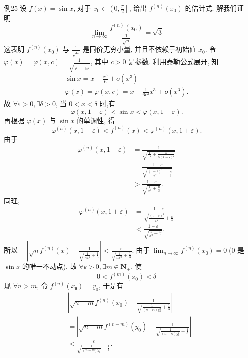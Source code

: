 例25 设 $f(x)=\sin x$, 对于 $x_0 \in\left(0, \frac{\pi}{2}\right]$, 给出 $f^{(n)}\left(x_0\right)$ 的估计式.
解我们证明
$$
\lim _{n \rightarrow \infty} \frac{f^{(n)}\left(x_0\right)}{\frac{1}{\sqrt{n}}}=\sqrt{3}
$$
这表明 $f^{(n)}\left(x_0\right)$ 与 $\frac{1}{\sqrt{n}}$ 是同价无穷小量, 并且不依赖于初始值 $x_0$.
令 $\varphi(x)=\varphi(x, c)=\frac{1}{\sqrt{\frac{1}{x^2}+\frac{1}{3 c^2}}}$, 其中 $c>0$ 是参数.
利用泰勒公式展开, 知
$$
\begin{gathered}
\sin x=x-\frac{x^3}{6}+o\left(x^3\right) \\
\varphi(x)=\varphi(x, c)=x-\frac{1}{6 c^2} x^3+o\left(x^3\right) .
\end{gathered}
$$
故 $\forall \varepsilon>0, \exists \delta>0$, 当 $0<x<\delta$ 时,有
$$
\varphi(x, 1-\varepsilon)<\sin x<\varphi(x, 1+\varepsilon) .
$$
再根据 $\varphi(x)$ 与 $\sin x$ 的单调性, 得
$$
\varphi^{(n)}(x, 1-\varepsilon)<f^{(n)}(x)<\varphi^{(n)}(x, 1+\varepsilon) .
$$
由于
$$
\begin{aligned}
\varphi^{(n)}(x, 1-\varepsilon) & =\frac{1}{\sqrt{\frac{1}{x^2}+\frac{n}{3(1-\varepsilon)^2}}} \\
& =\frac{1-\varepsilon}{\sqrt{\frac{(1-\varepsilon)^2}{x^2}+\frac{n}{3}}} \\
& >\frac{1-\varepsilon}{\sqrt{\frac{1}{x^2}+\frac{n}{3}}} .
\end{aligned}
$$
同理,
$$
\begin{aligned}
\varphi^{(n)}(x, 1+\varepsilon) & =\frac{1+\varepsilon}{\sqrt{\frac{(1+\varepsilon)^2}{x^2}+\frac{n}{3}}} \\
& <\frac{1+\varepsilon}{\sqrt{\frac{1}{x^2}+\frac{n}{3}}} .
\end{aligned}
$$
所以 $\quad\left|\sqrt{n} f^{(n)}(x)-\frac{1}{\sqrt{\frac{1}{n x^2}+\frac{1}{3}}}\right|<\frac{\varepsilon}{\sqrt{\frac{1}{n x^2}+\frac{1}{3}}}$.
由于 $\lim _{n \rightarrow \infty} f^{(n)}\left(x_0\right)=0$ (0 是 $\sin x$ 的唯一不动点), 故 $\forall \varepsilon>0, \exists m \in \mathbf{N}_{+}$, 使
$$
0<f^{(m)}\left(x_0\right)<\delta
$$
现 $\forall n>m$, 令 $f^{(n)}\left(x_0\right)=y_0$, 于是有
$$
\begin{aligned}
& \left|\sqrt{n-m} f^{(n)}\left(x_0\right)-\frac{1}{\sqrt{\frac{1}{(n-m) y_0^2}+\frac{1}{3}}}\right| \\
& =\left|\sqrt{n-m} f^{(n-m)}\left(y_0\right)-\frac{1}{\sqrt{\frac{1}{(n-m) y_0^2}+\frac{1}{3}}}\right| \\
& <\frac{\varepsilon}{\sqrt{\frac{1}{(n-m) y_0^2}+\frac{1}{3}}} \text {. } \\
&
\end{aligned}
$$
